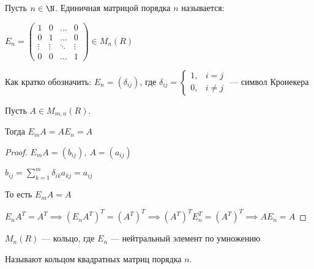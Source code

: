\begin{defn}
    Пусть $n \in \N$. Единичная матрицой порядка $n$ называется:

    $E_n = \begin{pmatrix}
        1 & 0 & \ldots & 0 \\
        0 & 1 & \ldots & 0 \\
        \vdots & \vdots & \ddots & \vdots \\
        0 & 0 & \ldots & 1  
    \end{pmatrix} \in M_{n}(R)$

    Как кратко обозначить: $E_n = (\delta_{ij})$, где $\delta_{ij} = \begin{cases}
        1, & i = j \\
        0, & i \neq j
    \end{cases}$ --- символ Кронекера
\end{defn}

\begin{theorem-non}

    Пусть $A \in M_{m, n}(R)$.

    Тогда $E_m A = A E_n = A$
\end{theorem-non}

\begin{proof}

    $E_m A = (b_{ij}),~ A = (a_{ij})$

    $b_{ij} = \sum\limits_{k = 1}^m \delta_{ik} a_{kj} = a_{ij}$

    То есть $E_m A = A$

    $E_n A^T = A^T \implies (E_n A^T)^T = (A^T)^T \implies (A^T)^T E_n^T = (A^T)^T \implies A E_n = A$
\end{proof}

\begin{follow}
    $M_{n}(R)$ --- кольцо, где $E_n$ --- нейтральный элемент по умножению

    Называют кольцом квадратных матриц порядка $n$.
\end{follow}


